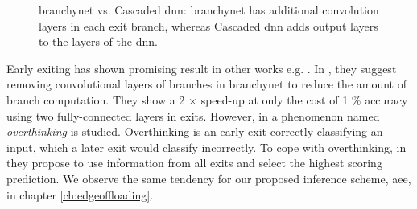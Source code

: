 \begin{figure}
	\hspace{2em}
	\caption[\gls{branchynet} vs. Cascaded \gls{dnn}]{\gls{branchynet} vs. Cascaded \gls{dnn}: \protect{} \gls{branchynet} has additional convolution layers in each exit branch, whereas \protect{} Cascaded \gls{dnn} adds output layers to the layers of the \gls{dnn}.}
	\label{fig:cascaded-vs-branchy}
\end{figure}

Early exiting has shown promising result in other works e.g. \cite{kaya_shallow-deep_nodate, berestizshevsky_sacrificing_2019,panda_conditional_2016}. In \cite{berestizshevsky_sacrificing_2019}, they suggest removing convolutional layers of branches in \gls{branchynet} to reduce the amount of branch computation. They show a 2 $ \times $ speed-up at only the cost of 1 \% accuracy using two fully-connected layers in exits.
However, in \cite{kaya_shallow-deep_nodate}  a phenomenon named \emph{overthinking} is studied. Overthinking is an early exit correctly classifying an input, which a later exit would classify incorrectly. To cope with overthinking, in \cite{kaya_shallow-deep_nodate} they propose to use information from all exits and select the highest scoring prediction. We observe the same tendency for our proposed inference scheme, \gls{aee}, in chapter \ref{ch:edgeoffloading}.

